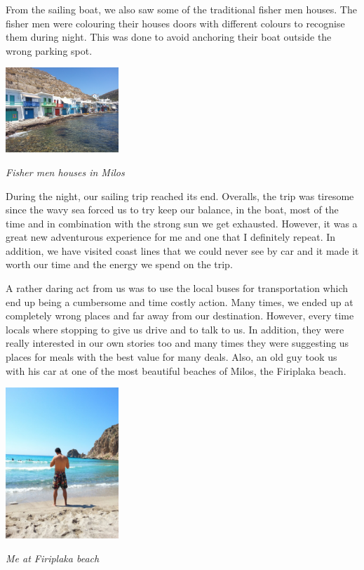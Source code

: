 \documentclass[10pt,a4paper]{article} %
\begin{document}
\begin{multicols}{3}
From the sailing boat, we also saw some of the traditional fisher men houses.  
The fisher men were colouring their houses doors with different colours 
to recognise them during night. 
This was done to avoid anchoring their boat outside the wrong parking spot.

\begin{center}
	\includegraphics[width=0.32\textwidth]{media/milos_houses.jpg}
	\par\textit{Fisher men houses in Milos}
\end{center}


During the night, our sailing trip reached its end. 
Overalls, the trip was tiresome since the wavy sea forced us to try keep our 
balance, in the boat, most of the time and in combination with the strong sun 
we get exhausted. 
However, it was a great new adventurous experience for me and one that 
I definitely repeat. 
In addition, we have visited coast lines that we could never see by car and it 
made it worth our time and the energy we spend on the trip. 


A rather daring act from us was to use the local buses for transportation which 
end up being a cumbersome and time costly action. 
Many times, we ended up at completely wrong places and far away from our 
destination. 
However, every time locals where stopping to give us drive and to talk to us. 
In addition, they were really interested in our own stories too and many times 
they were suggesting us places for meals with the best value for many deals. 
Also, an old guy took us with his car at one of the most beautiful beaches of 
Milos, the Firiplaka beach. 


\begin{center}
	\includegraphics[width=0.32\textwidth]{media/milos_beach.jpg}
	\par\textit{Me at Firiplaka beach}
\end{center}



\end{multicols}
\end{document}

